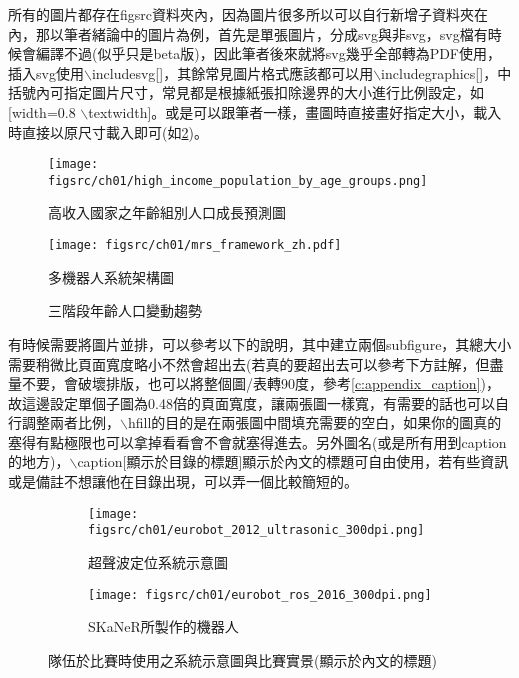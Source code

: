 所有的圖片都存在figsrc資料夾內，因為圖片很多所以可以自行新增子資料夾在內，那以筆者緒論中的圖片為例，首先是單張圖片，分成svg與非svg，svg檔有時候會編譯不過(似乎只是beta版)，因此筆者後來就將svg幾乎全部轉為PDF使用，插入svg使用$\backslash$includesvg{}[]，其餘常見圖片格式應該都可以用$\backslash$includegraphics{}[]，中括號內可指定圖片尺寸，常見都是根據紙張扣除邊界的大小進行比例設定，如[width=0.8 $\backslash$textwidth]。或是可以跟筆者一樣，畫圖時直接畫好指定大小，載入時直接以原尺寸載入即可(如\cref{fig:mrs_framework})。

\begin{figure}[htbp]
    \centering
    \texttt{[image: figsrc/ch01/high\_income\_population\_by\_age\_groups.png]}
    \caption{高收入國家之年齡組別人口成長預測圖\cite{nations2019world}}
    \label{fig:population_age_world}
\end{figure}

\begin{figure}[htbp]
    \centering
    \texttt{[image: figsrc/ch01/mrs\_framework\_zh.pdf]}
    \caption{多機器人系統架構圖}
    \label{fig:mrs_framework}
\end{figure}

\begin{figure}[htbp]
    \centering
    
    \caption{三階段年齡人口變動趨勢\cite{國發會年齡人口變動趨勢}}
    \label{fig:population_age_taiwan}
\end{figure}

有時候需要將圖片並排，可以參考以下的說明，其中建立兩個subfigure，其總大小需要稍微比頁面寬度略小不然會超出去(若真的要超出去可以參考下方註解，但盡量不要，會破壞排版，也可以將整個圖/表轉90度，參考\cref{c:appendix_caption})，故這邊設定單個子圖為0.48倍的頁面寬度，讓兩張圖一樣寬，有需要的話也可以自行調整兩者比例，$\backslash$hfill的目的是在兩張圖中間填充需要的空白，如果你的圖真的塞得有點極限也可以拿掉看看會不會就塞得進去。另外圖名(或是所有用到caption的地方)，$\backslash$caption[顯示於目錄的標題]{顯示於內文的標題}可自由使用，若有些資訊或是備註不想讓他在目錄出現，可以弄一個比較簡短的。

\begin{figure}[htbp]
    \centering
    \begin{subfigure}[b]{0.48\textwidth}
        \centering
        \texttt{[image: figsrc/ch01/eurobot\_2012\_ultrasonic\_300dpi.png]}
        \caption{超聲波定位系統示意圖\cite{eurobot_ultrasound_2013}}
        \label{fig:eurobot_2013_ultrasound}
    \end{subfigure}
    \hfill
    \begin{subfigure}[b]{0.48\textwidth}
        \centering
        \texttt{[image: figsrc/ch01/eurobot\_ros\_2016\_300dpi.png]}
        \caption{SKaNeR所製作的機器人\cite{eurobot_ros_2016}}
        \label{fig:eurobot_ros_2016}
    \end{subfigure}
    \caption[隊伍於比賽時使用之系統示意圖與比賽實景(顯示於目錄的標題)]{隊伍於比賽時使用之系統示意圖與比賽實景(顯示於內文的標題)}
    \label{fig:eurobot_2013_2016}
\end{figure}

